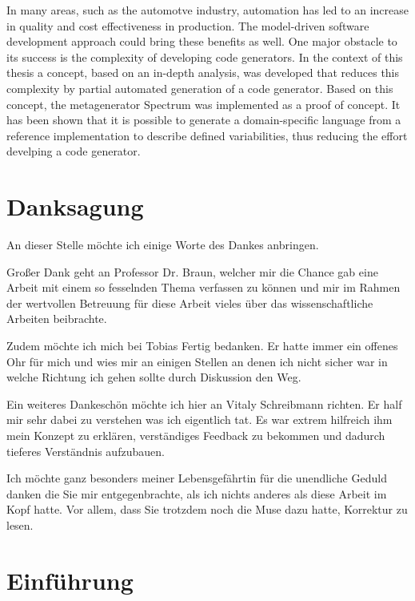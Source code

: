 \documentclass[12pt,oneside,a4paper,parskip]{scrbook}
\begin{document}
In many areas, such as the automotve industry, automation has led to an increase in quality and cost effectiveness in production. The model-driven software development approach could bring these benefits as well. One major obstacle to its success is the complexity of developing code generators. In the context of this thesis a concept, based on an in-depth analysis, was developed that reduces this complexity by partial automated generation of a code generator. Based on this concept, the metagenerator Spectrum was implemented as a proof of concept. It has been shown that it is possible to generate a domain-specific language from a reference implementation to describe defined variabilities, thus reducing the effort develping a code generator.

\newpage
\chapter*{Danksagung}

An dieser Stelle möchte ich einige Worte des Dankes anbringen. 

Großer Dank geht an Professor Dr. Braun, welcher mir die Chance gab eine Arbeit mit einem so fesselnden Thema verfassen zu können und mir im Rahmen der wertvollen Betreuung für diese Arbeit vieles über das wissenschaftliche Arbeiten beibrachte.

Zudem möchte ich mich bei Tobias Fertig bedanken. Er hatte immer ein offenes Ohr für mich und wies mir an einigen Stellen an denen ich nicht sicher war in welche Richtung ich gehen sollte durch Diskussion den Weg.

Ein weiteres Dankeschön möchte ich hier an Vitaly Schreibmann richten. Er half mir sehr dabei zu verstehen was ich eigentlich tat. Es war extrem hilfreich ihm mein Konzept zu erklären, verständiges Feedback zu bekommen und dadurch tieferes Verständnis aufzubauen.

Ich möchte ganz besonders meiner Lebensgefährtin für die unendliche Geduld danken die Sie mir entgegenbrachte, als ich nichts anderes als diese Arbeit im Kopf hatte. Vor allem, dass Sie trotzdem noch die Muse dazu hatte, Korrektur zu lesen.

\tableofcontents



\mainmatter


\chapter{Einführung}\label{ch:intro}
\end{document}
